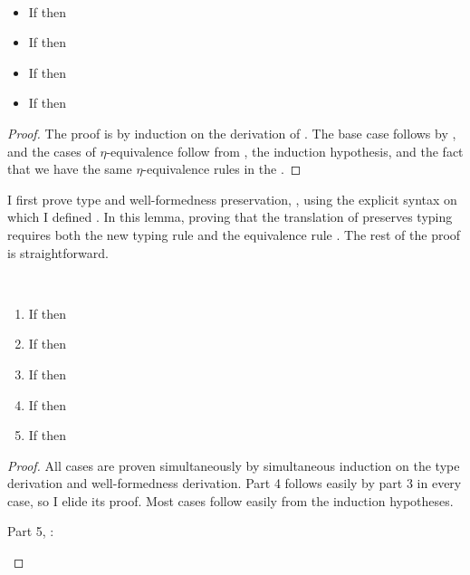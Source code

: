 {\begin{lemma}
  \label{lem:cps:cbn:pres-equiv}
  ~
  \begin{multicols}{2}
  \begin{itemize}
    \item If \im{\se \equiv \sepr} then \im{\se^{\div} \equiv \se^{\sprime\div}}
    \item If \im{\sA \equiv \sApr} then \im{\sA^{+} \equiv \sA^{\sprime+}}
    \item If \im{\sA \equiv \sApr} then \im{\sA^{\div} \equiv \sA^{\sprime\div}}
    \item If \im{\sK \equiv \sKpr} then \im{\sK^{+} \equiv \sK^{\sprime+}}
  \end{itemize}
  \end{multicols}
\end{lemma}
\begin{proof}
  The proof is by induction on the derivation of \im{\se \equiv \sepr}.
  The base case follows by , and the cases of \(\eta\)-equivalence follow
  from , the induction hypothesis, and the fact that we have the same
  \(\eta\)-equivalence rules in the \cps{}.
\end{proof}

I first prove type and well-formedness preservation,
, using the explicit syntax on which I defined
\cbnname{}.
In this lemma, proving that the translation of \im{\ssnde{\se}} preserves typing
requires both the new typing rule  and the equivalence rule
.
The rest of the proof is straightforward.
\begin{lemma}
  \label{lem:cps:cbn:type-pres}
  ~
  \begin{multicols}{2}
  \begin{enumerate}
  \item If \im{\swf{\slenv}} then \im{\cpswf{\slenv^{+}}}
  \item If \im{\styjudg{\slenv}{\se}{\sA}} then
    \im{\styjudg{\slenv^{+}}{\se^{\div}}{\sA^{\div}}}
  \item If \im{\styjudg{\slenv}{\sA}{\sK}} then
    \im{\cpstyjudg{\slenv^{+}}{\sA^{+}}{\sK^+}}
  \item If \im{\styjudg{\slenv}{\sA}{\sstarty}} then
    \im{\styjudg{\slenv^{+}}{\sA^{\div}}{\sstarty^+}}
  \item If \im{\styjudg{\slenv}{\sK}{\sU}} then
    \im{\cpstyjudg{\slenv^{+}}{\sK^{+}}{\sU^+}}
  \end{enumerate}
  \end{multicols}
\end{lemma}
\begin{proof}
  All cases are proven simultaneously by simultaneous induction on the type derivation and well-formedness
  derivation.
  Part 4 follows easily by part 3 in every case, so I elide its proof.
  Most cases follow easily from the induction hypotheses.
  \begin{proofcases}
  \item Part 5, : \im{\styjudg{\slenv}{\sstarty}{\sboxty}}


\end{proofcases}
\end{proof}}
